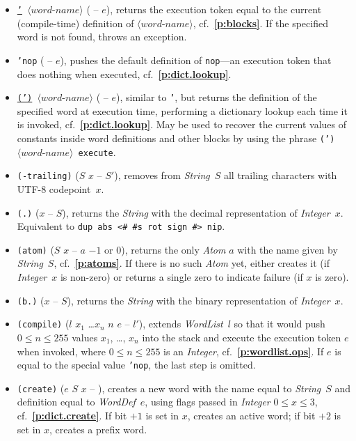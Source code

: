 \documentclass[12pt,oneside]{article}
\def\refpoint#1{{\rm\textbf{\ref{#1}}}}
\let\ptref=\refpoint
\begin{document}
\begin{itemize}
\item {\tt \underline{'} $\langle\textit{word-name}\rangle$} ( -- $e$), returns the execution token equal to the current (compile-time) definition of $\langle\textit{word-name}\rangle$, cf.~\ptref{p:blocks}. If the specified word is not found, throws an exception.
\item {\tt 'nop} ( -- $e$), pushes the default definition of {\tt nop}---an execution token that does nothing when executed, cf.~\ptref{p:dict.lookup}.
\item {\tt \underline{(')} $\langle\textit{word-name}\rangle$} ( -- $e$), similar to {\tt '}, but returns the definition of the specified word at execution time, performing a dictionary lookup each time it is invoked, cf.~\ptref{p:dict.lookup}. May be used to recover the current values of constants inside word definitions and other blocks by using the phrase {\tt (') $\langle\textit{word-name}\rangle$ execute}.
\item {\tt (-trailing)} ($S$ $x$ -- $S'$), removes from {\em String}~$S$ all trailing characters with UTF-8 codepoint~$x$.
\item {\tt (.)} ($x$ -- $S$), returns the {\em String\/} with the decimal representation of {\em Integer\/}~$x$. Equivalent to {\tt dup abs <\# \#s rot sign \#> nip}.
\item {\tt (atom)} ($S$ $x$ -- $a$ $-1$ or $0$), returns the only {\em Atom\/} $a$ with the name given by {\em String\/}~$S$, cf.~\ptref{p:atoms}. If there is no such {\em Atom\/} yet, either creates it (if {\em Integer\/}~$x$ is non-zero) or returns a single zero to indicate failure (if $x$ is zero).
\item {\tt (b.)} ($x$ -- $S$), returns the {\em String\/} with the binary representation of {\em Integer\/}~$x$.
\item {\tt (compile)} ($l$ $x_1$ \dots $x_n$ $n$ $e$ -- $l'$), extends {\em WordList\/}~$l$ so that it would push $0\leq n\leq 255$ values $x_1$, \ldots, $x_n$ into the stack and execute the execution token $e$ when invoked, where $0\leq n\leq 255$ is an {\em Integer}, cf.~\ptref{p:wordlist.ops}. If $e$ is equal to the special value {\tt 'nop}, the last step is omitted.
\item {\tt (create)} ($e$ $S$ $x$ -- ), creates a new word with the name equal to {\em String\/}~$S$ and definition equal to {\em WordDef\/}~$e$, using flags passed in {\em Integer\/} $0\leq x\leq 3$, cf.~\ptref{p:dict.create}. If bit $+1$ is set in $x$, creates an active word; if bit $+2$ is set in $x$, creates a prefix word.

\end{itemize}
\end{document}
